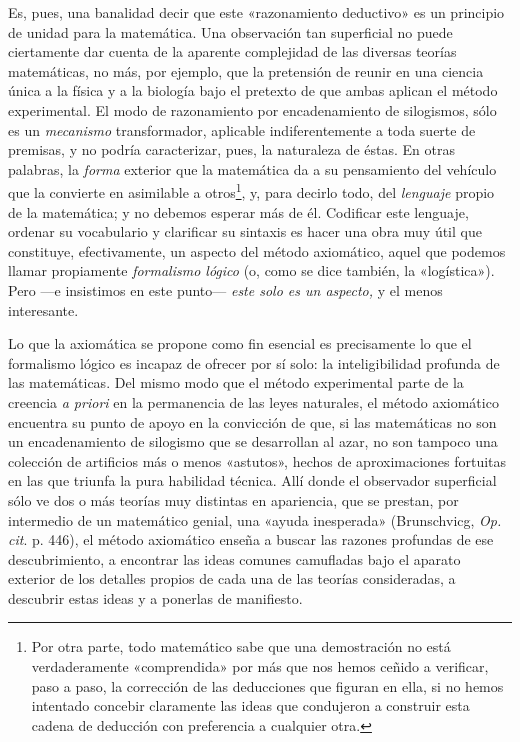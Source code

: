 \documentclass[a4paper, 12pt, draft]{article}
\begin{document}
 Es, pues, una banalidad decir que este «razonamiento deductivo» es un principio de unidad para la matemática. Una observación tan superficial no puede ciertamente dar cuenta de la aparente complejidad de las diversas teorías matemáticas, no más, por ejemplo, que la pretensión de reunir en una ciencia única a la física y a la biología bajo el pretexto de que ambas aplican el método experimental. El modo de razonamiento por encadenamiento de silogismos, sólo es un \textit{mecanismo} transformador, aplicable indiferentemente a toda suerte de premisas, y no podría caracterizar, pues, la naturaleza de éstas. En otras palabras, la \textit{forma} exterior que la matemática da a su pensamiento del vehículo que la convierte en asimilable a otros\footnote{Por otra parte, todo matemático sabe que una demostración no está verdaderamente «comprendida» por más que nos hemos ceñido a verificar, paso a paso, la corrección de las deducciones que figuran en ella, si no hemos intentado concebir claramente las ideas que condujeron a construir esta cadena de deducción con preferencia a cualquier otra.}, y, para decirlo todo, del \textit{lenguaje} propio de la matemática; y no debemos esperar más de él. Codificar este lenguaje, ordenar su vocabulario y clarificar su sintaxis es hacer una obra muy útil que constituye, efectivamente, un aspecto del método axiomático, aquel que podemos llamar propiamente \textit{formalismo lógico} (o, como se dice también, la «logística»). Pero ---e insistimos en este punto--- \textit{este solo es un aspecto,} y el menos interesante. 



Lo que la axiomática se propone como fin esencial es precisamente lo que el formalismo lógico es incapaz de ofrecer por sí solo: la inteligibilidad profunda de las matemáticas. Del mismo modo que el método experimental parte de la creencia \textit{a priori} en la permanencia de las leyes naturales, el método axiomático encuentra su punto de apoyo en la convicción de que, si las matemáticas no son un encadenamiento de silogismo que se desarrollan al azar, no son tampoco una colección de artificios más o menos «astutos», hechos de aproximaciones fortuitas en las que triunfa la pura habilidad técnica. Allí donde el observador superficial sólo ve dos o más teorías muy distintas en apariencia, que se prestan, por intermedio de un matemático genial, una «ayuda inesperada» (Brunschvicg, \textit{Op. cit}. p. 446), el método axiomático enseña a buscar las razones profundas de ese descubrimiento, a encontrar las ideas comunes camufladas bajo el aparato exterior de los detalles propios de cada una de las teorías consideradas, a descubrir estas ideas y a ponerlas de manifiesto.
\end{document}
